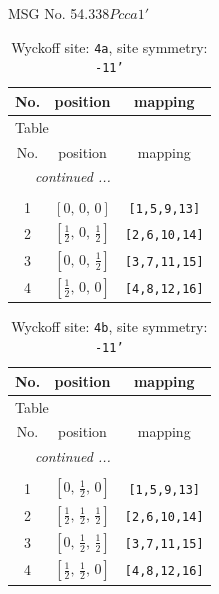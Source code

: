 \documentclass[fleqn,8pt]{jsarticle}
\begin{document}
\setcounter{MaxMatrixCols}{32}

\renewcommand{\tablename}{Table~}
\renewcommand{\figurename}{Figure~}
\begin{center}
\LARGE
MSG No. 54.338\quad$Pcca1'$
\end{center}
\renewcommand{\arraystretch}{1.2}
\begin{longtable}{ccc}
\caption{Wyckoff site: {\tt 4a}, site symmetry: {\tt -11'}}
 \\
 \hline \hline
No. & position & mapping \\ \hline \endfirsthead

\multicolumn{2}{l}{\tablename\ \thetable{}} \\
 \hline \hline
No. & position & mapping \\ \hline \endhead

 \hline \hline
\multicolumn{2}{r}{\footnotesize\it continued ...} \\ \endfoot

 \hline \hline
\multicolumn{2}{r}{} \\ \endlastfoot

1 & $\left[ 0,\, 0,\, 0 \right]$ & {\tt [1,5,9,13]} \\ \hline
2 & $\left[ \frac{1}{2},\, 0,\, \frac{1}{2} \right]$ & {\tt [2,6,10,14]} \\ \hline
3 & $\left[ 0,\, 0,\, \frac{1}{2} \right]$ & {\tt [3,7,11,15]} \\ \hline
4 & $\left[ \frac{1}{2},\, 0,\, 0 \right]$ & {\tt [4,8,12,16]} \\
\end{longtable}
\renewcommand{\arraystretch}{1.2}
\begin{longtable}{ccc}
\caption{Wyckoff site: {\tt 4b}, site symmetry: {\tt -11'}}
 \\
 \hline \hline
No. & position & mapping \\ \hline \endfirsthead

\multicolumn{2}{l}{\tablename\ \thetable{}} \\
 \hline \hline
No. & position & mapping \\ \hline \endhead

 \hline \hline
\multicolumn{2}{r}{\footnotesize\it continued ...} \\ \endfoot

 \hline \hline
\multicolumn{2}{r}{} \\ \endlastfoot

1 & $\left[ 0,\, \frac{1}{2},\, 0 \right]$ & {\tt [1,5,9,13]} \\ \hline
2 & $\left[ \frac{1}{2},\, \frac{1}{2},\, \frac{1}{2} \right]$ & {\tt [2,6,10,14]} \\ \hline
3 & $\left[ 0,\, \frac{1}{2},\, \frac{1}{2} \right]$ & {\tt [3,7,11,15]} \\ \hline
4 & $\left[ \frac{1}{2},\, \frac{1}{2},\, 0 \right]$ & {\tt [4,8,12,16]} \\
\end{longtable}
\end{document}

